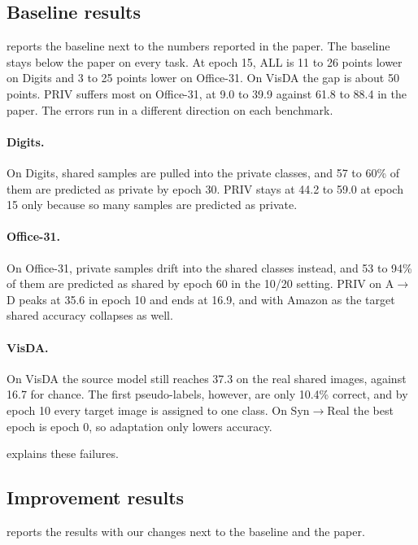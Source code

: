 \subsection{Baseline results}\label{sec:exp-vanilla}
 reports the baseline next to the numbers reported in the paper.
The baseline stays below the paper on every task.
At epoch 15, ALL is 11 to 26 points lower on Digits and 3 to 25 points lower on Office-31.
On VisDA the gap is about 50 points.
PRIV suffers most on Office-31, at 9.0 to 39.9 against 61.8 to 88.4 in the paper.
The errors run in a different direction on each benchmark.

\paragraph{Digits.}
On Digits, shared samples are pulled into the private classes, and 57 to 60\% of them are predicted as private by epoch 30.
PRIV stays at 44.2 to 59.0 at epoch 15 only because so many samples are predicted as private.

\paragraph{Office-31.}
On Office-31, private samples drift into the shared classes instead, and 53 to 94\% of them are predicted as shared by epoch 60 in the 10/20 setting.
PRIV on A$\to$D peaks at 35.6 in epoch 10 and ends at 16.9, and with Amazon as the target shared accuracy collapses as well.

\paragraph{VisDA.}
On VisDA the source model still reaches 37.3 on the real shared images, against 16.7 for chance.
The first pseudo-labels, however, are only 10.4\% correct, and by epoch 10 every target image is assigned to one class.
On Syn$\to$Real the best epoch is epoch 0, so adaptation only lowers accuracy.

 explains these failures.

\subsection{Improvement results}\label{sec:exp-improvements}
 reports the results with our changes next to the baseline and the paper.
